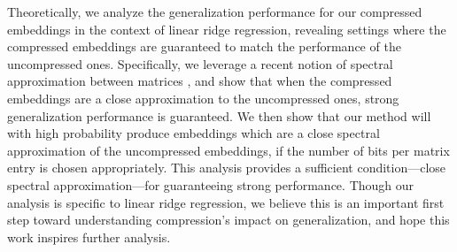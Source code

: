 Theoretically, we analyze the generalization performance for our compressed embeddings in the context of linear ridge regression, revealing settings where the compressed embeddings are guaranteed to match the performance of the uncompressed ones.
Specifically, we leverage a recent notion of spectral approximation between matrices \citep{avron17,lprff18}, and show that when the compressed embeddings are a close approximation to the uncompressed ones, strong generalization performance is guaranteed.
We then show that our method will with high probability produce embeddings which are a close spectral approximation of the uncompressed embeddings, if the number of bits per matrix entry is chosen appropriately.
This analysis provides a sufficient condition---close spectral approximation---for guaranteeing strong performance.
Though our analysis is specific to linear ridge regression, we believe this is an important first step toward understanding compression's impact on generalization, and hope this work inspires further analysis.


%
%
%
%
%
%
%
%
%
%
%
%
%
%
%
%

